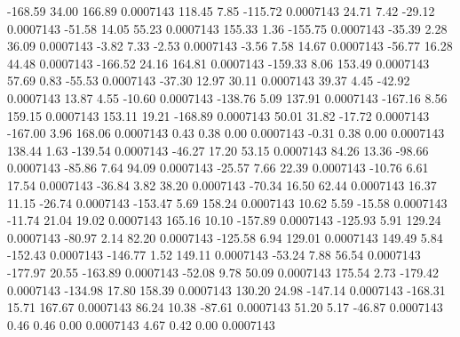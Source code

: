      -168.59       34.00      166.89     0.0007143
      118.45        7.85     -115.72     0.0007143
       24.71        7.42      -29.12     0.0007143
      -51.58       14.05       55.23     0.0007143
      155.33        1.36     -155.75     0.0007143
      -35.39        2.28       36.09     0.0007143
       -3.82        7.33       -2.53     0.0007143
       -3.56        7.58       14.67     0.0007143
      -56.77       16.28       44.48     0.0007143
     -166.52       24.16      164.81     0.0007143
     -159.33        8.06      153.49     0.0007143
       57.69        0.83      -55.53     0.0007143
      -37.30       12.97       30.11     0.0007143
       39.37        4.45      -42.92     0.0007143
       13.87        4.55      -10.60     0.0007143
     -138.76        5.09      137.91     0.0007143
     -167.16        8.56      159.15     0.0007143
      153.11       19.21     -168.89     0.0007143
       50.01       31.82      -17.72     0.0007143
     -167.00        3.96      168.06     0.0007143
        0.43        0.38        0.00     0.0007143
       -0.31        0.38        0.00     0.0007143
      138.44        1.63     -139.54     0.0007143
      -46.27       17.20       53.15     0.0007143
       84.26       13.36      -98.66     0.0007143
      -85.86        7.64       94.09     0.0007143
      -25.57        7.66       22.39     0.0007143
      -10.76        6.61       17.54     0.0007143
      -36.84        3.82       38.20     0.0007143
      -70.34       16.50       62.44     0.0007143
       16.37       11.15      -26.74     0.0007143
     -153.47        5.69      158.24     0.0007143
       10.62        5.59      -15.58     0.0007143
      -11.74       21.04       19.02     0.0007143
      165.16       10.10     -157.89     0.0007143
     -125.93        5.91      129.24     0.0007143
      -80.97        2.14       82.20     0.0007143
     -125.58        6.94      129.01     0.0007143
      149.49        5.84     -152.43     0.0007143
     -146.77        1.52      149.11     0.0007143
      -53.24        7.88       56.54     0.0007143
     -177.97       20.55     -163.89     0.0007143
      -52.08        9.78       50.09     0.0007143
      175.54        2.73     -179.42     0.0007143
     -134.98       17.80      158.39     0.0007143
      130.20       24.98     -147.14     0.0007143
     -168.31       15.71      167.67     0.0007143
       86.24       10.38      -87.61     0.0007143
       51.20        5.17      -46.87     0.0007143
        0.46        0.46        0.00     0.0007143
        4.67        0.42        0.00     0.0007143
